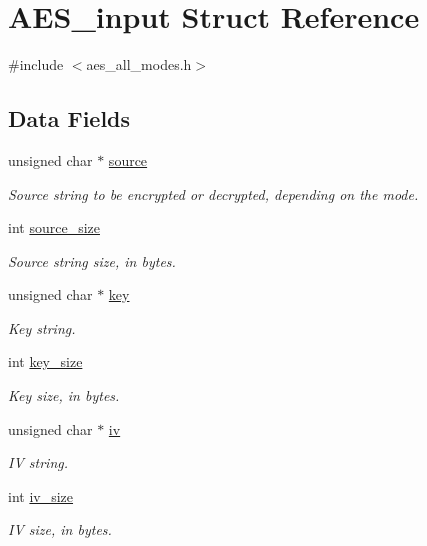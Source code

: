 \hypertarget{struct_a_e_s__input}{\section{A\+E\+S\+\_\+input Struct Reference}
\label{struct_a_e_s__input}
}


{\ttfamily \#include $<$aes\+\_\+all\+\_\+modes.\+h$>$}

\subsection*{Data Fields}
\begin{DoxyCompactItemize}
\item 
unsigned char $\ast$ \hyperlink{struct_a_e_s__input_a21c889ef9f8bd57ede165b4a8345b56e}{source}
\begin{DoxyCompactList}\small\item\em Source string to be encrypted or decrypted, depending on the mode. \end{DoxyCompactList}\item 
int \hyperlink{struct_a_e_s__input_a37fb0a3598c9ac44d977642bc51ab0e9}{source\+\_\+size}
\begin{DoxyCompactList}\small\item\em Source string size, in bytes. \end{DoxyCompactList}\item 
unsigned char $\ast$ \hyperlink{struct_a_e_s__input_a8e2f1bbcd8a1be74df6009c12b3287fd}{key}
\begin{DoxyCompactList}\small\item\em Key string. \end{DoxyCompactList}\item 
int \hyperlink{struct_a_e_s__input_a23eb3f0cf6f80d5af65710b78e3764d1}{key\+\_\+size}
\begin{DoxyCompactList}\small\item\em Key size, in bytes. \end{DoxyCompactList}\item 
unsigned char $\ast$ \hyperlink{struct_a_e_s__input_aab44e297cbbd902f78c8c9ca3e54d414}{iv}
\begin{DoxyCompactList}\small\item\em I\+V string. \end{DoxyCompactList}\item 
int \hyperlink{struct_a_e_s__input_a42171c2a76a538022c24e3612f089f15}{iv\+\_\+size}
\begin{DoxyCompactList}\small\item\em I\+V size, in bytes. \end{DoxyCompactList}\item 

\end{DoxyCompactItemize}
